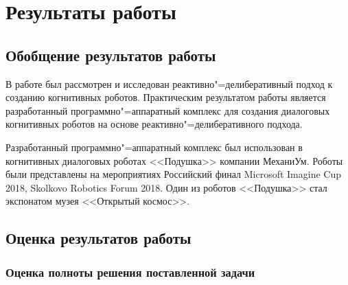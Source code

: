 \chapter{Результаты работы}
\section{Обобщение результатов работы}
В работе был рассмотрен и исследован реактивно"=делиберативный подход к созданию когнитивных роботов. Практическим результатом работы является разработанный программно"=аппаратный комплекс для создания диалоговых когнитивных роботов на основе реактивно"=делиберативного подхода. 

Разработанный программно"=аппаратный комплекс был использован в когнитивных диалоговых роботах <<Подушка>> компании МеханиУм. Роботы были представлены на мероприятиях Российский финал Microsoft Imagine Cup 2018, Skolkovo Robotics Forum 2018. Один из роботов <<Подушка>> стал экспонатом музея <<Открытый космос>>. 
\section{Оценка результатов работы}
\subsection{Оценка полноты решения поставленной задачи}
